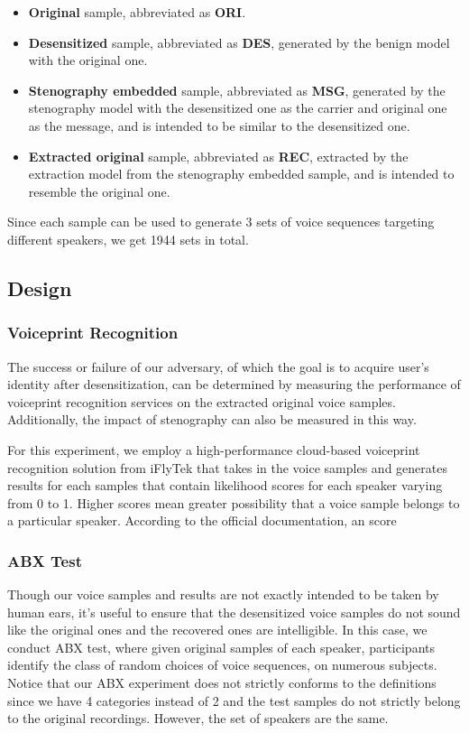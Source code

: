 \documentclass[journal]{IEEEtran} %
\begin{document}
\begin{itemize}
    \item \textbf{Original} sample, abbreviated as \textbf{ORI}.
    \item \textbf{Desensitized} sample, abbreviated as \textbf{DES}, generated by the benign model with the original one.
    \item \textbf{Stenography embedded} sample, abbreviated as \textbf{MSG}, generated by the stenography model with the desensitized one as the carrier and original one as the message, and is intended to be similar to the desensitized one.
    \item \textbf{Extracted original} sample, abbreviated as \textbf{REC}, extracted by the extraction model from the stenography embedded sample, and is intended to resemble the original one.
\end{itemize}

Since each sample can be used to generate 3 sets of voice sequences targeting different speakers, we get 1944 sets in total.

\subsection{Design}

\subsubsection{Voiceprint Recognition}

The success or failure of our adversary, of which the goal is to acquire user's identity after desensitization, can be determined by measuring the performance of voiceprint recognition services on the extracted original voice samples. Additionally, the impact of stenography can also be measured in this way.

For this experiment, we employ a high-performance cloud-based voiceprint recognition solution from iFlyTek that takes in the voice samples and generates results for each samples that contain likelihood scores for each speaker varying from 0 to 1. Higher scores mean greater possibility that a voice sample belongs to a particular speaker. According to the official documentation, an score

\subsubsection{ABX Test}

Though our voice samples and results are not exactly intended to be taken by human ears, it's useful to ensure that the desensitized voice samples do not sound like the original ones and the recovered ones are intelligible. In this case, we conduct ABX test, where given original samples of each speaker, participants identify the class of random choices of voice sequences, on numerous subjects. Notice that our ABX experiment does not strictly conforms to the definitions since we have 4 categories instead of 2 and the test samples do not strictly belong to the original recordings. However, the set of speakers are the same.
\end{document}
